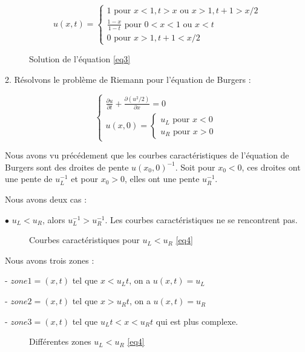 \documentclass{article}
\begin{document}
\[u(x,t) = \left\{ \begin{matrix}
	1 \text{ pour } x<1, t>x \text{ ou } x>1, t+1>x/2 \\
	\frac{1-x}{1-t} \text{ pour } 0<x<1 \text{ ou } x<t \\
	0 \text{ pour } x>1, t+1<x/2
\end{matrix} \right.
\tag{Sol3}
\]

\begin{figure}[h]
  
  \caption{Solution de l'équation \ref{eq3}}
\end{figure}

2. Résolvons le problème de Riemann pour l'équation de Burgers :

\[ \left\{ \begin{matrix}
	\frac{\partial u}{\partial t} + \frac{\partial (u^2/2)}{\partial x} = 0 \\
	u(x,0) = \left\{ \begin{matrix}
					u_L \text{ pour } x<0 \\
					u_R \text{ pour } x>0
	\end{matrix} \right.
\end{matrix} \right.
\label{eq4} \tag{Burgers2}
\]

Nous avons vu précédement que les courbes caractéristiques de l'équation de Burgers sont des droites de pente $u(x_0,0)^{-1}$. Soit pour $x_0<0$, ces droites ont une pente de $u_L^{-1}$ et pour $x_0>0$, elles ont une pente $u_R^{-1}$.
\newline

Nous avons deux cas :

$\bullet$ $u_L < u_R$, alors $u_L^{-1} > u_R^{-1}$. Les courbes caractéristiques ne se rencontrent pas.

\begin{figure}[h]
  
  \caption{Courbes caractéristiques pour $u_L < u_R$ \ref{eq4}}
\end{figure}

Nous avons trois zones :

- $zone1 = (x,t)$ tel que $x < u_L t$, on a $u(x,t) = u_L$

- $zone2 = (x,t)$ tel que $x > u_R t$, on a $u(x,t) = u_R$

- $zone3 = (x,t)$ tel que $u_L t < x < u_R t$ qui est plus complexe.

\begin{figure}[h]
  
  \caption{Différentes zones $u_L < u_R$ \ref{eq4}}
\end{figure}
\end{document}
